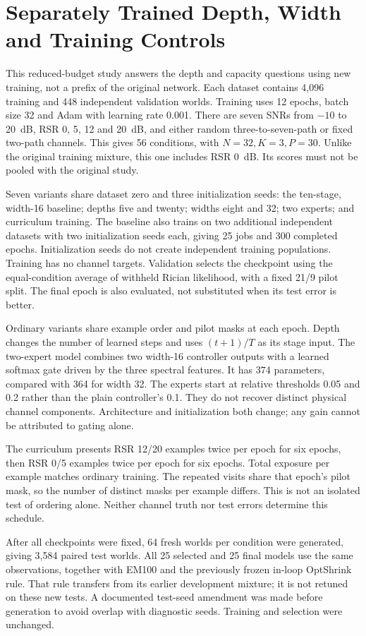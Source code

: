 \section{Separately Trained Depth, Width and Training Controls}
This reduced-budget study answers the depth and capacity questions using
new training, not a prefix of the original network. Each dataset contains
4,096 training and 448 independent validation worlds. Training uses 12
epochs, batch size 32 and Adam with learning rate 0.001. There are seven
SNRs from $-10$ to 20~dB, RSR 0, 5, 12 and 20~dB, and either random
three-to-seven-path or fixed two-path channels. This gives 56 conditions,
with $N=32,K=3,P=30$. Unlike the original training mixture, this one
includes RSR 0~dB. Its scores must not be pooled with the original study.

Seven variants share dataset zero and three initialization seeds: the
ten-stage, width-16 baseline; depths five and twenty; widths eight and
32; two experts; and curriculum training. The baseline also trains on
two additional independent datasets with two initialization seeds each,
giving 25 jobs and 300 completed epochs. Initialization seeds do not
create independent training populations. Training has no channel targets.
Validation selects the checkpoint using the equal-condition average of
withheld Rician likelihood, with a fixed 21/9 pilot split. The final
epoch is also evaluated, not substituted when its test error is better.

Ordinary variants share example order and pilot masks at each epoch.
Depth changes the number of learned steps and uses $(t+1)/T$ as its
stage input. The two-expert model combines two width-16 controller outputs
with a learned softmax gate driven by the three spectral features. It has
374 parameters, compared with 364 for width 32. The experts start at
relative thresholds 0.05 and 0.2 rather than the plain controller's 0.1.
They do not recover distinct physical channel components. Architecture
and initialization both change; any gain cannot be attributed to gating
alone.

The curriculum presents RSR 12/20 examples twice per epoch for six epochs,
then RSR 0/5 examples twice per epoch for six epochs. Total exposure per
example matches ordinary training. The repeated visits share that epoch's
pilot mask, so the number of distinct masks per example differs. This is
not an isolated test of ordering alone. Neither channel truth nor test
errors determine this schedule.

After all checkpoints were fixed, 64 fresh worlds per condition were
generated, giving 3,584 paired test worlds. All 25 selected and 25 final
models use the same observations, together with EM100 and the previously
frozen in-loop OptShrink rule. That rule transfers from its earlier
development mixture; it is not retuned on these new tests. A documented
test-seed amendment was made before generation to avoid overlap with
diagnostic seeds. Training and selection were unchanged.

